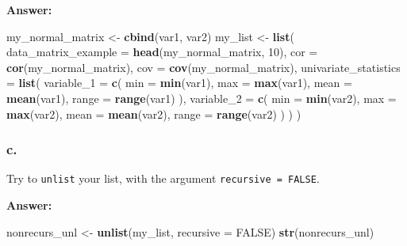\documentclass[]{article}
\newenvironment{Shaded}{\begin{snugshade}}{\end{snugshade}}
\newcommand{\DataTypeTok}[1]{\textcolor[rgb]{0.13,0.29,0.53}{#1}}
\newcommand{\DecValTok}[1]{\textcolor[rgb]{0.00,0.00,0.81}{#1}}
\newcommand{\KeywordTok}[1]{\textcolor[rgb]{0.13,0.29,0.53}{\textbf{#1}}}
\newcommand{\NormalTok}[1]{#1}
\newcommand{\OtherTok}[1]{\textcolor[rgb]{0.56,0.35,0.01}{#1}}
\newcommand{\StringTok}[1]{\textcolor[rgb]{0.31,0.60,0.02}{#1}}
\begin{document}
\textbf{Answer:}

\begin{Shaded}
\begin{Highlighting}[]
\NormalTok{my_normal_matrix <-}\StringTok{ }\KeywordTok{cbind}\NormalTok{(var1, var2)}
\NormalTok{my_list <-}\StringTok{ }\KeywordTok{list}\NormalTok{(}
  \DataTypeTok{data_matrix_example =} \KeywordTok{head}\NormalTok{(my_normal_matrix, }\DecValTok{10}\NormalTok{),}
  \DataTypeTok{cor =} \KeywordTok{cor}\NormalTok{(my_normal_matrix),}
  \DataTypeTok{cov =} \KeywordTok{cov}\NormalTok{(my_normal_matrix),}
  \DataTypeTok{univariate_statistics =} \KeywordTok{list}\NormalTok{(}
    \DataTypeTok{variable_1 =} \KeywordTok{c}\NormalTok{(}
      \DataTypeTok{min =} \KeywordTok{min}\NormalTok{(var1), }
      \DataTypeTok{max =} \KeywordTok{max}\NormalTok{(var1), }
      \DataTypeTok{mean =} \KeywordTok{mean}\NormalTok{(var1), }
      \DataTypeTok{range =} \KeywordTok{range}\NormalTok{(var1)}
\NormalTok{    ), }
    \DataTypeTok{variable_2 =} \KeywordTok{c}\NormalTok{(}
      \DataTypeTok{min =} \KeywordTok{min}\NormalTok{(var2), }
      \DataTypeTok{max =} \KeywordTok{max}\NormalTok{(var2), }
      \DataTypeTok{mean =} \KeywordTok{mean}\NormalTok{(var2), }
      \DataTypeTok{range =} \KeywordTok{range}\NormalTok{(var2)}
\NormalTok{    )}
\NormalTok{  )}
\NormalTok{)  }
\end{Highlighting}
\end{Shaded}

\hypertarget{c.-1}{%
\subsubsection{c.}\label{c.-1}}

Try to \texttt{unlist} your list, with the argument
\texttt{recursive\ =\ FALSE}.

\textbf{Answer:}

\begin{Shaded}
\begin{Highlighting}[]
\NormalTok{nonrecurs_unl <-}\StringTok{ }\KeywordTok{unlist}\NormalTok{(my_list, }\DataTypeTok{recursive =} \OtherTok{FALSE}\NormalTok{)}
\KeywordTok{str}\NormalTok{(nonrecurs_unl)}
\end{Highlighting}
\end{Shaded}
\end{document}
